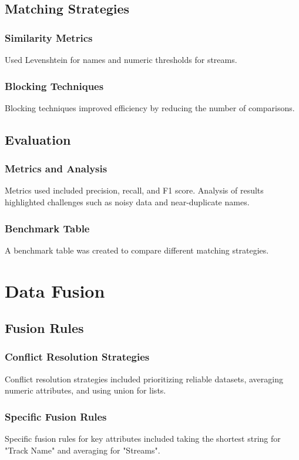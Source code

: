 \documentclass[runningheads]{llncs}
\begin{document}
\subsection{Matching Strategies}
\subsubsection{Similarity Metrics}
Used Levenshtein for names and numeric thresholds for streams.

\subsubsection{Blocking Techniques}
Blocking techniques improved efficiency by reducing the number of comparisons.

\subsection{Evaluation}
\subsubsection{Metrics and Analysis}
Metrics used included precision, recall, and F1 score. Analysis of results highlighted challenges such as noisy data and near-duplicate names.

\subsubsection{Benchmark Table}
A benchmark table was created to compare different matching strategies.

\section{Data Fusion}
\subsection{Fusion Rules}
\subsubsection{Conflict Resolution Strategies}
Conflict resolution strategies included prioritizing reliable datasets, averaging numeric attributes, and using union for lists.

\subsubsection{Specific Fusion Rules}
Specific fusion rules for key attributes included taking the shortest string for "Track Name" and averaging for "Streams".
\end{document}
